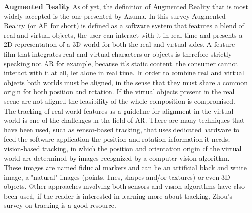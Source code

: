 \documentclass{article}
\begin{document}
\textbf{Augmented Reality}\newline
As of yet, the definition of Augmented Reality that is most widely accepted is the one presented by Azuma\cite{azuma1997}. In this survey Augmented Reality (or AR for short) is defined as a software system that features a blend of real and virtual objects, the user can interact with it in real time and presents a 2D representation of a 3D world for both the real and virtual sides. A feature film that integrates real and virtual characters or objects is therefore strictly speaking not AR for example, because it's static content, the consumer cannot interact with it at all, let alone in real time.
In order to combine real and virtual objects both worlds must be aligned, in the sense that they must share a common origin for both position and rotation. If the virtual objects present in the real scene are not aligned the feasibility of the whole composition is compromised. The tracking of real world features as a guideline for alignment in the virtual world is one of the challenges in the field of AR. There are many techniques that have been used, such as sensor-based tracking, that uses dedicated hardware to feed the software application the position and rotation information it needs; vision-based tracking, in which the position and orientation origin of the virtual world are determined by images recognized by a computer vision algorithm. These images are named fiducial markers and can be an artificial black and white image, a "natural" images (points, lines, shapes and/or textures) or even 3D objects. Other approaches involving both sensors and vision algorithms have also been used, if the reader is interested in learning more about tracking, Zhou's survey\cite{zhou2008} on tracking is a good resource.
\end{document}
